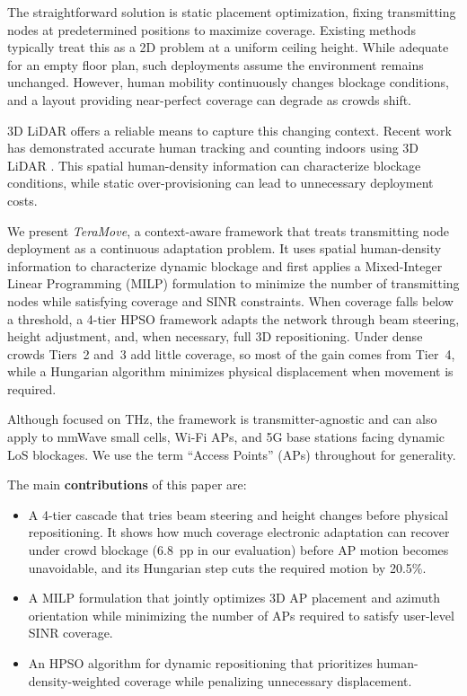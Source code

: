 \documentclass[conference]{IEEEtran}
\begin{document}
	The straightforward solution is static placement optimization, fixing transmitting nodes at predetermined positions to maximize coverage. Existing methods typically treat this as a 2D problem at a uniform ceiling height. While adequate for an empty floor plan, such deployments assume the environment remains unchanged. However, human mobility continuously changes blockage conditions, and a layout providing near-perfect coverage can degrade as crowds shift.

	3D LiDAR offers a reliable means to capture this changing context. Recent work has demonstrated accurate human tracking and counting indoors using 3D LiDAR \cite{b27,b29}. This spatial human-density information can characterize blockage conditions, while static over-provisioning can lead to unnecessary deployment costs.

	We present \textit{TeraMove}, a context-aware framework that treats transmitting node deployment as a continuous adaptation problem. It uses spatial human-density information to characterize dynamic blockage and first applies a Mixed-Integer Linear Programming (MILP) formulation to minimize the number of transmitting nodes while satisfying coverage and SINR constraints. When coverage falls below a threshold, a 4-tier HPSO framework adapts the network through beam steering, height adjustment, and, when necessary, full 3D repositioning. Under dense crowds Tiers~2 and~3 add little coverage, so most of the gain comes from Tier~4, while a Hungarian algorithm minimizes physical displacement when movement is required.

	Although focused on THz, the framework is transmitter-agnostic and can also apply to mmWave small cells, Wi-Fi APs, and 5G base stations facing dynamic LoS blockages. We use the term ``Access Points'' (APs) throughout for generality.

	The main \textbf{contributions} of this paper are:
	\begin{itemize}
		\item A 4-tier cascade that tries beam steering and height changes before physical repositioning. It shows how much coverage electronic adaptation can recover under crowd blockage (6.8~pp in our evaluation) before AP motion becomes unavoidable, and its Hungarian step cuts the required motion by 20.5\%.

		\item A MILP formulation that jointly optimizes 3D AP placement and azimuth orientation while minimizing the number of APs required to satisfy user-level SINR coverage.

		\item An HPSO algorithm for dynamic repositioning that prioritizes human-density-weighted coverage while penalizing unnecessary displacement.
	\end{itemize}
\end{document}
